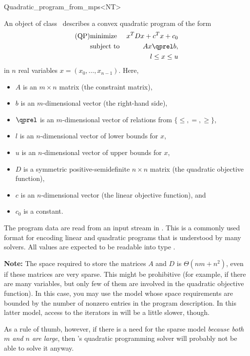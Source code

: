\begin{ccRefClass}{Quadratic_program_from_mps<NT>}


\ccDefinition
An object of class \ccRefName\ describes a convex quadratic program of the form
\begin{eqnarray*}
\mbox{(QP)}& \mbox{minimize} & x^{T}Dx+c^{T}x+c_0 \\
&\mbox{subject to}   & Ax\qprel b, \\
&                    & l \leq x \leq u
\end{eqnarray*}
in $n$ real variables $x=(x_0,\ldots,x_{n-1})$.
Here, 
\begin{itemize}
\item $A$ is an $m\times n$ matrix (the constraint matrix), 
\item $b$ is an $m$-dimensional vector (the right-hand side),
\item $\qprel$ is an $m$-dimensional vector of relations 
from $\{\leq, =, \geq\}$, 
\item $l$ is an $n$-dimensional vector of lower
bounds for $x$,
\item $u$ is an $n$-dimensional vector of upper bounds for
$x$, 
\item $D$ is a symmetric positive-semidefinite $n\times n$ matrix (the
  quadratic objective function),
\item $c$ is an $n$-dimensional vector (the linear objective
  function), and 
\item $c_0$ is a constant.
\end{itemize}

The program data are read from an input stream in . This is
a commonly used format for encoding linear and quadratic programs that
is understood by many solvers. All values are expected to be readable
into type .

\textbf{Note:} 
The space required to store the matrices
$A$ and $D$ is $\Theta(nm + n^2)$, even if these matrices are very sparse. This
might be prohibitive (for example, if there are many variables, but only
few of them are involved in the quadratic objective function). In this
case, you may use the model 
whose space requirements are bounded by the number of nonzero entries
in the program description. In this latter model, access to the iterators 
in  will be a little slower, though.

As a rule of thumb, however, if there is a need for the sparse model
\emph{because both $m$ and $n$ are large}, then \cgal's quadratic
programming solver will probably not be able to solve it anyway.


\end{ccRefClass}
